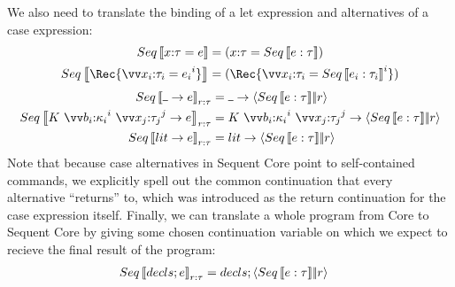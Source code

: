 \documentclass{article}
\begin{document}
We also need to translate the binding of a let expression and alternatives of a
case expression:
\begin{align*}
  Seq\trans{\ann x \ty = \expr}
  &=
  (\ann x \ty = Seq\trans{\expr : \ty})
  \\
  Seq\trans{\Rec \{ \vect[i]{\ann{x_i}{\ty_i} = \expr_i} \}}
  &=
  (\Rec \{ \vect[i]{\ann{x_i}{\ty_i} = Seq\trans{\expr_i : \ty_i}} \})
\end{align*}
\begin{align*}
  Seq\trans{\blank \to \expr}_{r:\ty}
  &=
  \blank \to \cut{Seq\trans{\expr : \ty}}{r}
  \\
  Seq\trans{
    K ~ \vect[i]{\ann{b_i}{\ki_i}} ~ \vect[j]{\ann{x_j}{\ty_j}} \to \expr
  }_{r:\ty}
  &=
  K ~ \vect[i]{\ann{b_i}{\ki_i}} ~ \vect[j]{\ann{x_j}{\ty_j}}
  \to
  \cut{Seq\trans{\expr : \ty}}{r}
  \\
  Seq\trans{\lit \to \expr}_{r:\ty}
  &=
  \lit \to \cut{Seq\trans{\expr : \ty}}{r}
\end{align*}
Note that because case alternatives in Sequent Core point to self-contained
commands, we explicitly spell out the common continuation that every alternative
``returns'' to, which was introduced as the return continuation for the case
expression itself.  Finally, we can translate a whole program from Core to
Sequent Core by giving some chosen continuation variable on which we expect to
recieve the final result of the program:
\begin{align*}
  Seq\left\llbracket{decls; e}\right\rrbracket_{r:\tau} &= decls; \left\langle{Seq\left\llbracket{e:\tau}\right\rrbracket}\middle|\!\middle|{r}\right\rangle
\end{align*}
\end{document}
